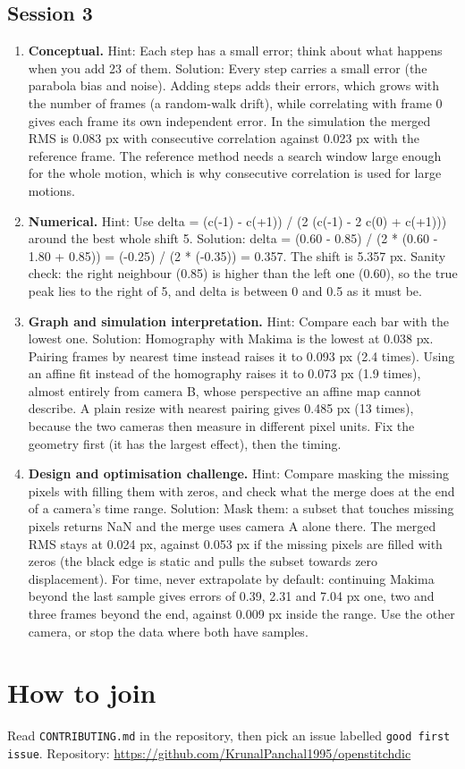 \documentclass[11pt,a4paper]{article}
\begin{document}
\subsection*{Session 3}
\begin{enumerate}[nosep]
\item \textbf{Conceptual.} Hint: Each step has a small error; think about what happens when you add 23 of them. Solution: Every step carries a small error (the parabola bias and noise). Adding steps adds their errors, which grows with the number of frames (a random-walk drift), while correlating with frame 0 gives each frame its own independent error. In the simulation the merged RMS is 0.083 px with consecutive correlation against 0.023 px with the reference frame. The reference method needs a search window large enough for the whole motion, which is why consecutive correlation is used for large motions.
\item \textbf{Numerical.} Hint: Use delta = (c(-1) - c(+1)) / (2 (c(-1) - 2 c(0) + c(+1))) around the best whole shift 5. Solution: delta = (0.60 - 0.85) / (2 * (0.60 - 1.80 + 0.85)) = (-0.25) / (2 * (-0.35)) = 0.357. The shift is 5.357 px. Sanity check: the right neighbour (0.85) is higher than the left one (0.60), so the true peak lies to the right of 5, and delta is between 0 and 0.5 as it must be.
\item \textbf{Graph and simulation interpretation.} Hint: Compare each bar with the lowest one. Solution: Homography with Makima is the lowest at 0.038 px. Pairing frames by nearest time instead raises it to 0.093 px (2.4 times). Using an affine fit instead of the homography raises it to 0.073 px (1.9 times), almost entirely from camera B, whose perspective an affine map cannot describe. A plain resize with nearest pairing gives 0.485 px (13 times), because the two cameras then measure in different pixel units. Fix the geometry first (it has the largest effect), then the timing.
\item \textbf{Design and optimisation challenge.} Hint: Compare masking the missing pixels with filling them with zeros, and check what the merge does at the end of a camera's time range. Solution: Mask them: a subset that touches missing pixels returns NaN and the merge uses camera A alone there. The merged RMS stays at 0.024 px, against 0.053 px if the missing pixels are filled with zeros (the black edge is static and pulls the subset towards zero displacement). For time, never extrapolate by default: continuing Makima beyond the last sample gives errors of 0.39, 2.31 and 7.04 px one, two and three frames beyond the end, against 0.009 px inside the range. Use the other camera, or stop the data where both have samples.
\end{enumerate}

\section{How to join}
Read \texttt{CONTRIBUTING.md} in the repository, then pick an issue labelled \texttt{good first issue}. Repository: \url{https://github.com/KrunalPanchal1995/openstitchdic}
\end{document}
